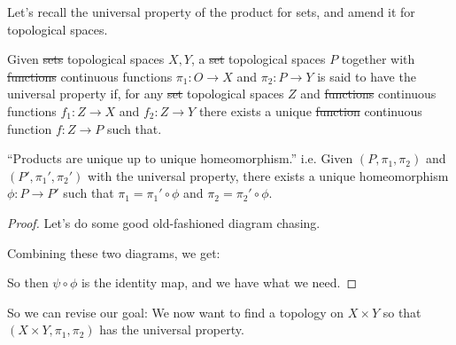 \documentclass[12pt, twosided]{article}
\begin{document}
  Let's recall the universal property of the product for sets, and amend it for topological spaces.
  \begin{thm}
    Given \sout{sets} {\color{red} topological spaces} \(X, Y\), a \sout{set} {\color{red} topological spaces} \(P\) together with \sout{functions} {\color{red} continuous functions} \(\pi_1: O \to X\) and \(\pi_2: P \to Y\) is said to have the universal property if, for any \sout{set} {\color{red} topological spaces} \(Z\) and \sout{functions} {\color{red} continuous functions} \(f_1: Z \to X\) and \(f_2: Z \to Y\) there exists a unique \sout{function} {\color{red} continuous function} \(f: Z \to P\) such that.

    \begin{center}
    \end{center}
  \end{thm}
  \begin{prop}
    ``Products are unique up to unique homeomorphism.''
    i.e. Given \((P, \pi_1, \pi_2)\) and \((P\prime, \pi_1\prime, \pi_2\prime)\) with the universal property, there exists a unique homeomorphism \(\phi: P \to P\prime\) such that \(\pi_1 = \pi_1\prime \circ \phi\) and \(\pi_2 = \pi_2\prime \circ \phi\). 
  \end{prop}
  \begin{proof} Let's do some good old-fashioned diagram chasing.
    \begin{center}
    \end{center}
    Combining these two diagrams, we get:
    \begin{center}
    \end{center}
    So then \(\psi \circ \phi\) is the identity map, and we have what we need.
  \end{proof}
    So we can revise our goal: We now want to find a topology on \(X \times Y\) so that \((X \times Y, \pi_1, \pi_2)\) has the universal property.
\end{document}
